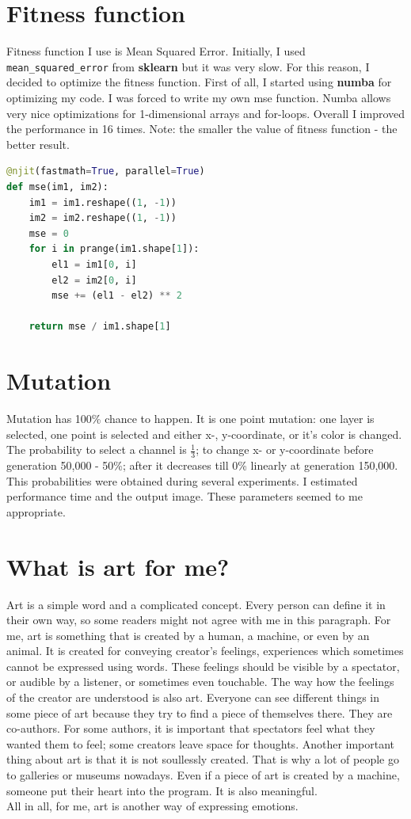 \documentclass{article}
\begin{document}
\section{Fitness function}
Fitness function I use is Mean Squared Error. Initially, I used \texttt{mean\_squared\_error} from \textbf{sklearn} but it was very slow. For this reason, I decided to optimize the fitness function. First of all, I started using \textbf{numba} for optimizing my code. I was forced to write my own mse function. Numba allows very nice optimizations for 1-dimensional arrays and for-loops. Overall I improved the performance in 16 times. Note: the smaller the value of fitness function - the better result.
\begin{lstlisting}[language=Python]
@njit(fastmath=True, parallel=True)
def mse(im1, im2):
    im1 = im1.reshape((1, -1))
    im2 = im2.reshape((1, -1))
    mse = 0
    for i in prange(im1.shape[1]):
        el1 = im1[0, i]
        el2 = im2[0, i]
        mse += (el1 - el2) ** 2

    return mse / im1.shape[1]
\end{lstlisting}

\section{Mutation}
Mutation has 100\% chance to happen. It is one point mutation: one layer is selected, one point is selected and either x-, y-coordinate, or it's color is changed. The probability to select a channel is $\frac{1}{3}$; to change x- or y-coordinate before generation 50,000 - 50\%; after it decreases till 0\% linearly at generation 150,000.
This probabilities were obtained during several experiments. I estimated performance time and the output image. These parameters seemed to me appropriate.

\section{What is art for me?}
Art is a simple word and a complicated concept. Every person can define it in their own way, so some readers might not agree with me in this paragraph. For me, art is something that is created by a human, a machine, or even by an animal. It is created for conveying creator's feelings, experiences which sometimes cannot be expressed using words. These feelings should be visible by a spectator, or audible by a listener, or sometimes even touchable. The way how the feelings of the creator are understood is also art. Everyone can see different things in some piece of art because they try to find a piece of themselves there. They are co-authors. For some authors, it is important that spectators feel what they wanted them to feel; some creators leave space for thoughts. Another important thing about art is that it is not soullessly created. That is why a lot of people go to galleries or museums nowadays. Even if a piece of art is created by a machine, someone put their heart into the program. It is also meaningful. \\
All in all, for me, art is another way of expressing emotions.
\end{document}
